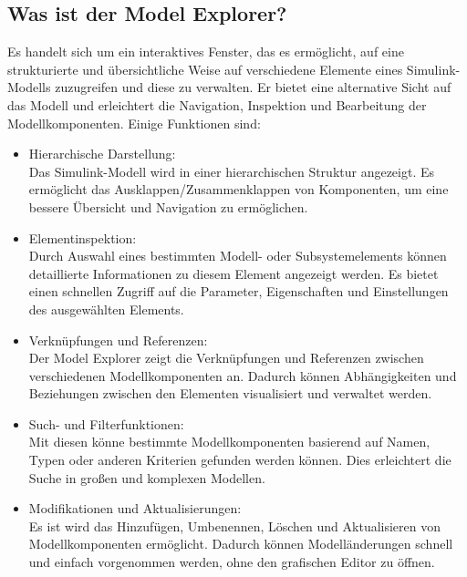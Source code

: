 \documentclass{article}
\begin{document}
\begin{multicols}{2}
		\subsection{Was ist der Model Explorer?}
			Es handelt sich um ein interaktives Fenster, das es ermöglicht, auf eine strukturierte und übersichtliche Weise auf verschiedene Elemente eines Simulink-Modells zuzugreifen und diese zu verwalten. Er bietet eine alternative Sicht auf das Modell und erleichtert die Navigation, Inspektion und Bearbeitung der Modellkomponenten.
			Einige Funktionen sind:
			\begin{itemize}
				\item Hierarchische Darstellung: \\Das Simulink-Modell wird in einer hierarchischen Struktur angezeigt. Es ermöglicht das Ausklappen/Zusammenklappen von Komponenten, um eine bessere Übersicht und Navigation zu ermöglichen.
				\item Elementinspektion: \\Durch Auswahl eines bestimmten Modell- oder Subsystemelements können detaillierte Informationen zu diesem Element angezeigt werden. Es bietet einen schnellen Zugriff auf die Parameter, Eigenschaften und Einstellungen des ausgewählten Elements.
				\item Verknüpfungen und Referenzen: \\Der Model Explorer zeigt die Verknüpfungen und Referenzen zwischen verschiedenen Modellkomponenten an. Dadurch können Abhängigkeiten und Beziehungen zwischen den Elementen visualisiert und verwaltet werden.
				\item Such- und Filterfunktionen: \\Mit diesen könne bestimmte Modellkomponenten basierend auf Namen, Typen oder anderen Kriterien gefunden werden können. Dies erleichtert die Suche in großen und komplexen Modellen.
				\item Modifikationen und Aktualisierungen: \\Es ist wird das Hinzufügen, Umbenennen, Löschen und Aktualisieren von Modellkomponenten ermöglicht. Dadurch können Modelländerungen schnell und einfach vorgenommen werden, ohne den grafischen Editor zu öffnen.
			\end{itemize}

\end{multicols}
\end{document}
